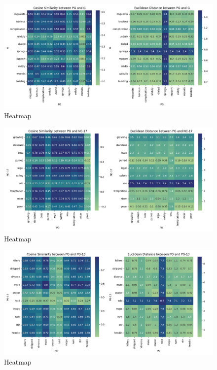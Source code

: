 \documentclass[a4paper]{article}
\begin{document}
\begin{figure}[ht]
    \centering
    \includegraphics[width=1\textwidth]{../stats/HeatMap_PG_G.png}
    \caption{Heatmap}
\end{figure}

\begin{figure}[ht]
    \centering
    \includegraphics[width=1\textwidth]{../stats/HeatMap_PG_NC-17.png}
    \caption{Heatmap}
\end{figure}

\begin{figure}[ht]
    \centering
    \includegraphics[width=1\textwidth]{../stats/HeatMap_PG_PG-13.png}
    \caption{Heatmap}
\end{figure}
\end{document}
